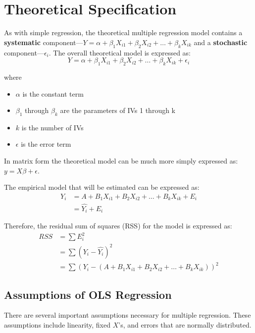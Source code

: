 \documentclass[11pt,openany]{book}\usepackage[]{graphicx}\usepackage[]{color}
\begin{document}
{\section{Theoretical Specification}

As with simple regression, the theoretical multiple regression model contains a \textbf{systematic} component---$Y = \alpha + \beta_{1}
X_{i1}+\beta_{2} X_{i2}+\ldots+\beta_{k} X_{ik}$ and a \textbf{stochastic} component---$\epsilon_{i}$. The overall theoretical model is expressed as: 
\begin{equation*}
Y = \alpha + \beta_{1} X_{i1}+\beta_{2} X_{i2}+\ldots+\beta_{k} X_{ik}+\epsilon_{i}
\end{equation*}

\noindent where
\begin{itemize}
\item $\alpha$ is the constant term 
\item $\beta_{1}$ through $\beta_{k}$ are the parameters of IVs 1 through k 
\item $k$ is the number of IVs
\item $\epsilon$ is the error term  
\end{itemize}

\noindent In matrix form the theoretical model can be much more simply expressed as: 
$y = X\beta+\epsilon$.

\noindent The empirical model that will be estimated can be expressed as: 
\begin{align*}
 Y_{i} &= A+B_{1}X_{i1}+B_{2}X_{i2}+\ldots+B_{k}X_{ik}+E_{i} \\
 &= \hat{Y_{i}}+E_{i}
\end{align*}

\noindent Therefore, the residual sum of squares (RSS) for the model is expressed as: 
\begin{align*}
RSS &= \sum E^{2}_{i} \\
&= \sum(Y_{i}-\hat{Y_{i}})^{2} \\
&= \sum(Y_{i}-(A+B_{1}X_{i1}+B_{2}X_{i2}+\ldots+B_{k}X_{ik}))^{2} 
\end{align*}

\subsection{Assumptions of OLS Regression} 

There are several important assumptions necessary for multiple regression. These
assumptions include linearity, fixed $X$'s, and errors that are normally distributed.

}
\end{document}
